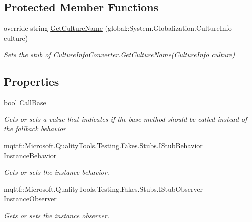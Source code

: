 \subsection*{Protected Member Functions}
\begin{DoxyCompactItemize}
\item 
override string \hyperlink{class_system_1_1_component_model_1_1_fakes_1_1_stub_culture_info_converter_afed609fb1dea91dafdda3406378758ac}{Get\-Culture\-Name} (global\-::\-System.\-Globalization.\-Culture\-Info culture)
\begin{DoxyCompactList}\small\item\em Sets the stub of Culture\-Info\-Converter.\-Get\-Culture\-Name(\-Culture\-Info culture)\end{DoxyCompactList}\end{DoxyCompactItemize}
\subsection*{Properties}
\begin{DoxyCompactItemize}
\item 
bool \hyperlink{class_system_1_1_component_model_1_1_fakes_1_1_stub_culture_info_converter_ae0abc49088ce673b27dffe18240d97a8}{Call\-Base}
\begin{DoxyCompactList}\small\item\em Gets or sets a value that indicates if the base method should be called instead of the fallback behavior\end{DoxyCompactList}\item 
mqttf\-::\-Microsoft.\-Quality\-Tools.\-Testing.\-Fakes.\-Stubs.\-I\-Stub\-Behavior \hyperlink{class_system_1_1_component_model_1_1_fakes_1_1_stub_culture_info_converter_a95aeb4d08fb742ddf31fadae3b303f90}{Instance\-Behavior}
\begin{DoxyCompactList}\small\item\em Gets or sets the instance behavior.\end{DoxyCompactList}\item 
mqttf\-::\-Microsoft.\-Quality\-Tools.\-Testing.\-Fakes.\-Stubs.\-I\-Stub\-Observer \hyperlink{class_system_1_1_component_model_1_1_fakes_1_1_stub_culture_info_converter_aa574b994e7669f377536d6dd989731c0}{Instance\-Observer}
\begin{DoxyCompactList}\small\item\em Gets or sets the instance observer.\end{DoxyCompactList}\end{DoxyCompactItemize}


